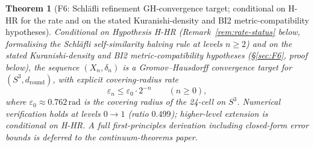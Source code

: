 \documentclass[12pt]{article}
\newtheorem{theorem}{Theorem}
\theoremstyle{definition}
\theoremstyle{remark}
\begin{document}
\begin{theorem}[F6: Schl\"afli refinement GH-convergence target; conditional on H-HR for the rate and on the stated Kuranishi-density and BI2 metric-compatibility hypotheses]\label{thm:F6}
Conditional on Hypothesis H-HR (Remark~\ref{rem:rate-status} below, formalising the Schl\"afli self-similarity halving rule at levels $n \ge 2$) and on the stated Kuranishi-density and BI2 metric-compatibility hypotheses (\S\ref{sec:F6}, proof below), the sequence $(X_n, \delta_n)$ is a Gromov--Hausdorff convergence target for $(S^3, d_{\mathrm{round}})$, with explicit covering-radius rate
\begin{equation}\label{eq:eps-rate}
\varepsilon_n \le \varepsilon_0 \cdot 2^{-n} \qquad (n \ge 0),
\end{equation}
where $\varepsilon_0 \approx 0.762\,\mathrm{rad}$ is the covering radius of the 24-cell on $S^3$. Numerical verification holds at levels $0 \to 1$ (ratio $0.499$); higher-level extension is conditional on H-HR. A full first-principles derivation including closed-form error bounds is deferred to the continuum-theorems paper.
\end{theorem}
\end{document}
